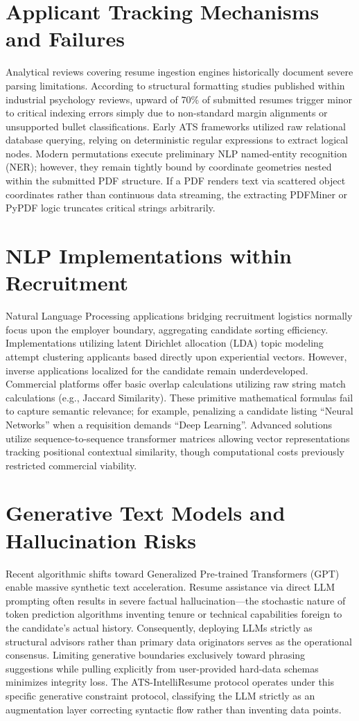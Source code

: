 \documentclass[12pt,a4paper]{report}
\begin{document}
\section{Applicant Tracking Mechanisms and Failures}
Analytical reviews covering resume ingestion engines historically document severe parsing limitations. According to structural formatting studies published within industrial psychology reviews, upward of 70\% of submitted resumes trigger minor to critical indexing errors simply due to non-standard margin alignments or unsupported bullet classifications. Early ATS frameworks utilized raw relational database querying, relying on deterministic regular expressions to extract logical nodes. Modern permutations execute preliminary NLP named-entity recognition (NER); however, they remain tightly bound by coordinate geometries nested within the submitted PDF structure. If a PDF renders text via scattered object coordinates rather than continuous data streaming, the extracting PDFMiner or PyPDF logic truncates critical strings arbitrarily.

\section{NLP Implementations within Recruitment}
Natural Language Processing applications bridging recruitment logistics normally focus upon the employer boundary, aggregating candidate sorting efficiency. Implementations utilizing latent Dirichlet allocation (LDA) topic modeling attempt clustering applicants based directly upon experiential vectors. However, inverse applications localized for the candidate remain underdeveloped. Commercial platforms offer basic overlap calculations utilizing raw string match calculations (e.g., Jaccard Similarity). These primitive mathematical formulas fail to capture semantic relevance; for example, penalizing a candidate listing ``Neural Networks'' when a requisition demands ``Deep Learning''. Advanced solutions utilize sequence-to-sequence transformer matrices allowing vector representations tracking positional contextual similarity, though computational costs previously restricted commercial viability.

\section{Generative Text Models and Hallucination Risks}
Recent algorithmic shifts toward Generalized Pre-trained Transformers (GPT) enable massive synthetic text acceleration. Resume assistance via direct LLM prompting often results in severe factual hallucination—the stochastic nature of token prediction algorithms inventing tenure or technical capabilities foreign to the candidate’s actual history. Consequently, deploying LLMs strictly as structural advisors rather than primary data originators serves as the operational consensus. Limiting generative boundaries exclusively toward phrasing suggestions while pulling explicitly from user-provided hard-data schemas minimizes integrity loss. The ATS-IntelliResume protocol operates under this specific generative constraint protocol, classifying the LLM strictly as an augmentation layer correcting syntactic flow rather than inventing data points.
\end{document}

